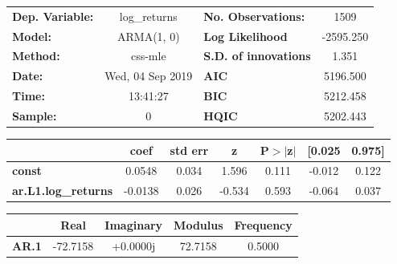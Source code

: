 \begin{center}
\begin{tabular}{lclc}
\toprule
\textbf{Dep. Variable:}     &        log\_returns       & \textbf{  No. Observations:  } &            1509            \\
\textbf{Model:}             &         ARMA(1, 0)        & \textbf{  Log Likelihood     } &         -2595.250          \\
\textbf{Method:}            &          css-mle          & \textbf{  S.D. of innovations} &           1.351            \\
\textbf{Date:}              &      Wed, 04 Sep 2019     & \textbf{  AIC                } &          5196.500          \\
\textbf{Time:}              &          13:41:27         & \textbf{  BIC                } &          5212.458          \\
\textbf{Sample:}            &             0             & \textbf{  HQIC               } &          5202.443          \\
\bottomrule
\end{tabular}
\begin{tabular}{lcccccc}
                            & \textbf{coef} & \textbf{std err} & \textbf{z} & \textbf{P$> |$z$|$} & \textbf{[0.025} & \textbf{0.975]}  \\
\midrule
\textbf{const}              &       0.0548  &        0.034     &     1.596  &         0.111        &       -0.012    &        0.122     \\
\textbf{ar.L1.log\_returns} &      -0.0138  &        0.026     &    -0.534  &         0.593        &       -0.064    &        0.037     \\
\bottomrule
\end{tabular}
\begin{tabular}{lcccc}
              & \textbf{            Real} & \textbf{         Imaginary} & \textbf{         Modulus} & \textbf{        Frequency}  \\
\midrule
\textbf{AR.1} &              -72.7158     &                +0.0000j     &               72.7158     &                0.5000       \\
\bottomrule
\end{tabular}
\end{center}
